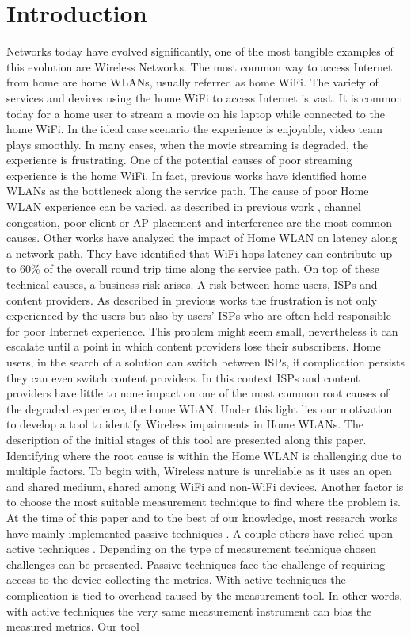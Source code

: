\section{Introduction}\label{Introduction}


Networks today have evolved significantly, one of the most tangible examples of this evolution are Wireless Networks. The most common way to access Internet from home are home WLANs, usually referred as home WiFi. The variety of services and devices using the home WiFi to access Internet is vast. It is common today for a home user to stream a movie on his laptop while connected to the home WiFi. In the ideal case scenario the experience is enjoyable, video team plays smoothly. In many cases, when the movie streaming is degraded, the experience is frustrating. One of the potential causes of poor streaming experience is the home WiFi. In fact, previous works \cite{homeoraccesslink} have identified home WLANs as the bottleneck along the service path. The cause of poor Home WLAN experience can be varied, as described in previous work \cite{wislow}, channel congestion, poor client or AP placement and interference are the most common causes. Other works \cite{wifi_weakest_link} have analyzed the impact of Home WLAN on latency along a network path. They have identified that WiFi hops latency can contribute up to 60\% of the overall round trip time along the service path. On top of these technical causes, a business risk arises. A risk between home users, ISPs and content providers. As described in previous works \cite{predicting_effect_Home_Wifi} the frustration is not only experienced by the users but also by users' ISPs who are often held responsible for poor Internet experience. This problem might seem small, nevertheless it can escalate until a point in which content providers lose their subscribers. Home users, in the search of a solution can switch between ISPs, if complication persists they can even switch content providers. In this context ISPs and content providers have little to none impact on one of the most common root causes of the degraded experience, the home WLAN. Under this light lies our motivation to develop a tool to identify Wireless impairments in Home WLANs. The description of the initial stages of this tool are presented along this paper. Identifying where the root cause is within the Home WLAN is challenging due to multiple factors. To begin with, Wireless nature is unreliable as it uses an open and shared medium, shared among WiFi and non-WiFi devices. Another factor is to choose the most suitable measurement technique to find where the problem is. At the time of this paper and to the best of our knowledge, most research works have mainly implemented passive techniques \cite{hostview} \cite{passive_wifi_capacity_estimation}. A couple others have relied upon active techniques \cite{can_user_level_probing}. Depending on the type of measurement technique chosen challenges can be presented. Passive techniques face the challenge of requiring access to the device collecting the metrics. With active techniques the complication is tied to overhead caused by the measurement tool. In other words, with active techniques the very same measurement instrument can bias the measured metrics. Our tool 
